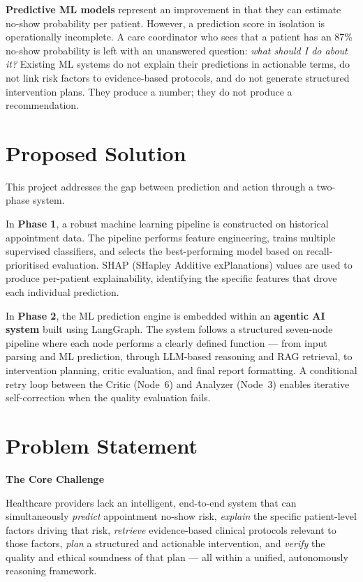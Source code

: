 \documentclass[12pt, a4paper]{report}
\begin{document}
\textbf{Predictive ML models} represent an improvement in that they can estimate no-show probability per patient. However, a prediction score in isolation is operationally incomplete. A care coordinator who sees that a patient has an 87\% no-show probability is left with an unanswered question: \textit{what should I do about it?} Existing ML systems do not explain their predictions in actionable terms, do not link risk factors to evidence-based protocols, and do not generate structured intervention plans. They produce a number; they do not produce a recommendation.

\section{Proposed Solution}

This project addresses the gap between prediction and action through a two-phase system.

In \textbf{Phase 1}, a robust machine learning pipeline is constructed on historical appointment data. The pipeline performs feature engineering, trains multiple supervised classifiers, and selects the best-performing model based on recall-prioritised evaluation. SHAP (SHapley Additive exPlanations) values are used to produce per-patient explainability, identifying the specific features that drove each individual prediction.

In \textbf{Phase 2}, the ML prediction engine is embedded within an \textbf{agentic AI system} built using LangGraph. The system follows a structured seven-node pipeline where each node performs a clearly defined function --- from input parsing and ML prediction, through LLM-based reasoning and RAG retrieval, to intervention planning, critic evaluation, and final report formatting. A conditional retry loop between the Critic (Node~6) and Analyzer (Node~3) enables iterative self-correction when the quality evaluation fails.

\vspace{1.3cm}
\section{Problem Statement}

\vspace{0.3cm}
\begin{problembox}
\textbf{\large The Core Challenge}

\vspace{0.4cm}
Healthcare providers lack an intelligent, end-to-end system that can simultaneously \textit{predict} appointment no-show risk, \textit{explain} the specific patient-level factors driving that risk, \textit{retrieve} evidence-based clinical protocols relevant to those factors, \textit{plan} a structured and actionable intervention, and \textit{verify} the quality and ethical soundness of that plan --- all within a unified, autonomously reasoning framework.
\end{problembox}
\end{document}
